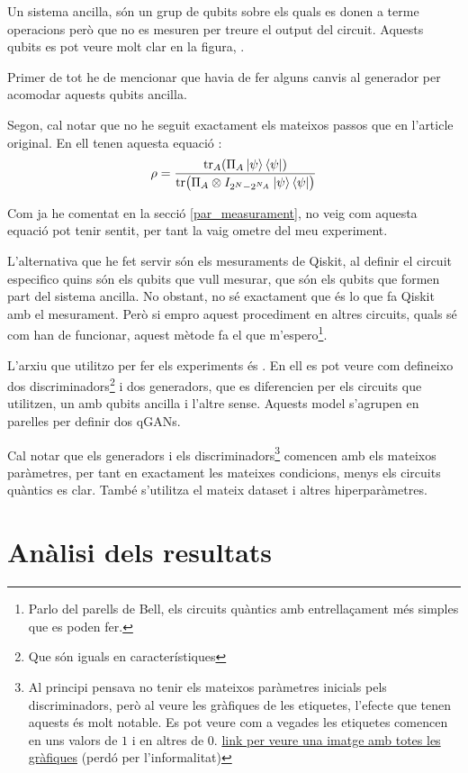 Un sistema ancilla, són un grup de qubits sobre els quals es donen a terme operacions però que no es mesuren per treure el output del circuit. Aquests qubits es pot veure molt clar en la figura, . 

Primer de tot he de mencionar que havia de fer alguns canvis al generador per acomodar aquests qubits ancilla. 

Segon, cal notar que no he seguit exactament els mateixos passos que en l'article original. En ell tenen aquesta equació \cite{QGAN_exp}: 
\begin{equation*}
\rho = \frac{\tr_A(\Pi_A \ket{\psi}\bra{\psi})}{\tr(\Pi_A\otimes I_{2^N-2^{N_A}}\ket{\psi}\bra{\psi})}
\end{equation*}

Com ja he comentat en la secció \ref{par_measurament}, no veig com aquesta equació pot tenir sentit, per tant la vaig ometre del meu experiment. 

L'alternativa que he fet servir són els mesuraments de Qiskit, al definir el circuit especifico quins són els qubits que vull mesurar, que són els qubits que formen part del sistema ancilla. No obstant, no sé exactament que és lo que fa Qiskit amb el mesurament. Però si empro aquest procediment en altres circuits, quals sé com han de funcionar, aquest mètode fa el que m'espero\footnote{Parlo del parells de Bell, els circuits quàntics amb entrellaçament més simples que es poden fer.}. 

L'arxiu que utilitzo per fer els experiments és . En ell es pot veure com defineixo dos discriminadors\footnote{Que són iguals en característiques} i dos generadors, que es diferencien per els circuits que utilitzen, un amb qubits ancilla i l'altre sense. Aquests model s'agrupen en parelles per definir dos qGANs. 

Cal notar que els generadors i els discriminadors\footnote{Al principi pensava no tenir els mateixos paràmetres inicials pels discriminadors, però al veure les gràfiques de les etiquetes, l'efecte que tenen aquests és molt notable. Es pot veure com a vegades les etiquetes comencen en uns valors de $1$ i en altres de $0$. \href{https://drive.google.com/file/d/1kYZ1vmNYU17sofNluXFYnoATLfY5B0jG/view?usp=sharing}{link per veure una imatge amb totes les gràfiques} (perdó per l'informalitat)} comencen amb els mateixos paràmetres, per tant en exactament les mateixes condicions, menys els circuits quàntics es clar. També s'utilitza el mateix dataset i altres hiperparàmetres. 

\section{Anàlisi dels resultats}


 